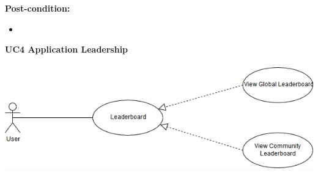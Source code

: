 \documentclass[11pt]{article}
\begin{document}
\textbf{Post-condition: } \\
\begin{itemize}
	\item 
\end{itemize}
\textbf{UC4 Application Leadership}\\\\
\includegraphics[scale=0.5]{./DiagramsAzhar/LeaderBoard.png}\\\\
\end{document}
